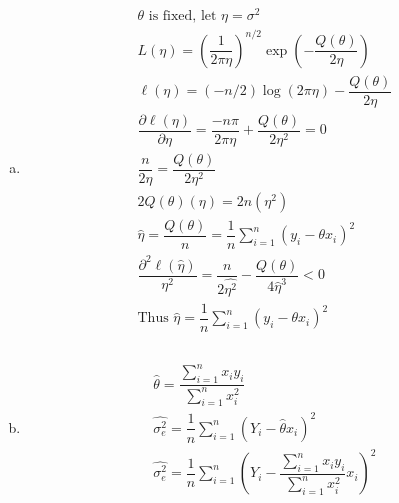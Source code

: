 \documentclass{article}
\newcommand{\dll}[1]{\dfrac{\partial \ell({#1})}{\partial{#1}}}
\begin{document}
\begin{flushleft}
\begin{enumerate}[(a)]
	\item 
\begin{multline*}\\
\theta \text{ is fixed, let } \eta=\sigma^2\\
L(\eta)=\left(\dfrac{1}{2\pi\eta}\right)^{n/2}\exp\left(-\dfrac{Q(\theta)}{2\eta}\right)\\
\ell(\eta)=(-n/2)\log(2\pi\eta)-\dfrac{Q(\theta)}{2\eta}\\
\dll{\eta}=\dfrac{-n\pi}{2\pi\eta}+\dfrac{Q(\theta)}{2\eta^2}=0\\
\dfrac{n}{2\eta}=\dfrac{Q(\theta)}{2\eta^2}\\
2Q(\theta)(\eta)=2n(\eta^2)\\
\hat{\eta}=\dfrac{Q(\theta)}{n}=\dfrac{1}{n}\sum_{i=1}^{n}(y_i-\theta x_i)^2\\
\dfrac{\partial^2\ell(\hat{\eta})}{\eta^2}=\dfrac{n}{2\hat{\eta^2}}-\dfrac{Q(\theta)}{4\hat{\eta}^3}<0\\
\text{Thus }\hat{\eta}=\dfrac{1}{n}\sum_{i=1}^{n}(y_i-\theta x_i)^2\\
\end{multline*}

	\item 
\begin{multline*}\\
\hat{\theta}=\dfrac{\sum_{i=1}^{n}x_iy_i}{\sum_{i=1}^{n}x_i^2}\\
\hat{\sigma_e^2}=\dfrac{1}{n}\sum_{i=1}^{n}(Y_i-\hat{\theta}x_i)^2\\
\hat{\sigma_e^2}=\dfrac{1}{n}\sum_{i=1}^{n}(Y_i-\dfrac{\sum_{i=1}^{n}x_iy_i}{\sum_{i=1}^{n}x_i^2}x_i)^2\\
\end{multline*}
	
\end{enumerate}

\end{flushleft}
\end{document}

